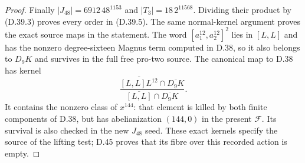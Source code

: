 \begin{proof}
Finally $|J_{48}|=6912\,48^{1153}$ and
$|T_3|=18\,2^{11568}$. Dividing their product by
(D.39.3) proves every order in (D.39.5). The same
normal-kernel argument proves the exact source
maps in the statement. The word
$[a_1^{12},a_2^{12}]^2$ lies in $[L,L]$ and has
the nonzero degree-sixteen Magnus term computed
in D.38, so it also belongs to $D_9K$ and survives
in the full free pro-two source. The canonical
map to D.38 has kernel
\[
 \frac{\overline{[L,L]L^{12}}\cap\overline{D_9K}}
      {\overline{[L,L]}\cap\overline{D_9K}}.                \tag{D.39.22}
\]
It contains the nonzero class of $x^{144}$: that
element is killed by both finite components of
D.38, but has abelianization $(144,0)$ in the
present $\mathcal F$. Its survival is also checked
in the new $J_{48}$ seed. These exact kernels
specify the source of the lifting test; D.45 proves that
its fibre over this recorded action is empty.
\end{proof}
